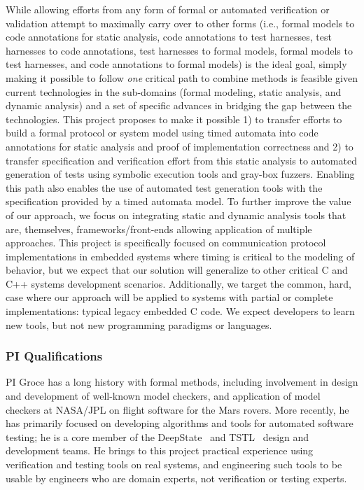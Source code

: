 While allowing efforts from any form of formal or automated verification or validation attempt to maximally carry over to other forms (i.e., formal models to code annotations for static analysis, code annotations to test harnesses, test harnesses to code annotations, test harnesses to formal models, formal models to test harnesses, and code annotations to formal models) is the ideal goal, simply making it possible to follow \emph{one} critical path to combine methods is feasible given current technologies in the sub-domains (formal modeling, static analysis, and dynamic analysis) and a set of specific advances in bridging the gap between the technologies.  This project proposes to make it possible 1) to transfer efforts to build a formal protocol or system model using timed automata into code annotations for static analysis and proof of implementation correctness and 2) to transfer specification and verification effort from this static analysis to automated generation of tests using symbolic execution tools and gray-box fuzzers.  Enabling this path also enables the use of automated test generation tools with the specification provided by a timed automata model.  To further improve the value of our approach, we focus on integrating static and dynamic analysis tools that are, themselves, frameworks/front-ends allowing application of multiple approaches.  This project is specifically focused on communication protocol implementations in embedded systems where timing is critical to the modeling of behavior, but we expect that our solution will generalize to other critical C and C++ systems development scenarios.  Additionally, we target the common, hard, case where our approach will be applied to systems with partial or complete implementations: typical legacy embedded C code.  We expect developers to learn new tools, but not new programming paradigms or languages.

\subsubsection{PI Qualifications}

PI Groce has a long history with formal methods, including involvement in design and development of well-known model checkers, and application of model checkers at NASA/JPL on flight software for the Mars rovers.  More recently, he has primarily focused on developing algorithms and tools for automated software testing; he is a core member of the DeepState~\cite{DeepState,deepstatetutorial,deepstaterepo} and TSTL~\cite{tstlsttt} design and development teams.  He brings to this project practical experience using verification and testing tools on real systems, and engineering such tools to be usable by engineers who are domain experts, not verification or testing experts.

